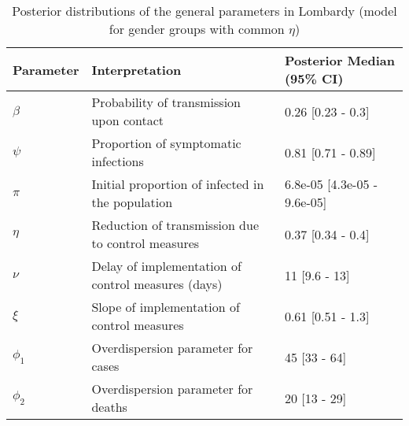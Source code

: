 \begin{table}[ht]
\centering
\begin{tabular}{lp{9cm}p{3cm}}
  \hline
Parameter & Interpretation & Posterior Median (95\% CI) \\ 
  \hline
$\beta$ & Probability of transmission upon contact & 0.26 [0.23 - 0.3] \\ 
  $\psi$ & Proportion of symptomatic infections & 0.81 [0.71 - 0.89] \\ 
  $\pi$ & Initial proportion of infected in the population & 6.8e-05 [4.3e-05 - 9.6e-05] \\ 
  $\eta$ & Reduction of transmission due to control measures & 0.37 [0.34 - 0.4] \\ 
  $\nu$ & Delay of implementation of control measures (days) & 11 [9.6 - 13] \\ 
  $\xi$ & Slope of implementation of control measures & 0.61 [0.51 - 1.3] \\ 
  $\phi_1$ & Overdispersion parameter for cases & 45 [33 - 64] \\ 
  $\phi_2$ & Overdispersion parameter for deaths & 20 [13 - 29] \\ 
   \hline
\end{tabular}
\caption{Posterior distributions of the general parameters in Lombardy (model for gender groups with common $\eta$)} 
\label{tab:ParamTableLombardy_Gender_CommonEta}
\end{table}
